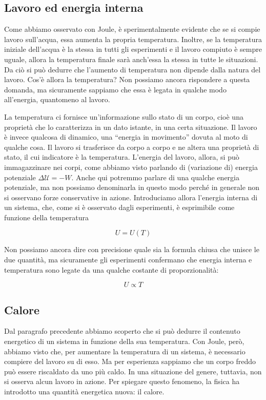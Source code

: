 \subsection{Lavoro ed energia interna}
Come abbiamo osservato con Joule, è sperimentalmente evidente che
se si compie lavoro sull'acqua, essa
aumenta la propria temperatura. Inoltre, se la temperatura iniziale
dell'acqua è la stessa in tutti gli esperimenti e il lavoro compiuto
è sempre uguale, allora la temperatura finale sarà anch'essa la stessa
in tutte le situazioni. Da ciò si può dedurre che l'aumento di
temperatura non dipende dalla natura del lavoro. Cos'è allora la
temperatura? Non possiamo ancora rispondere a questa domanda, ma
sicuramente sappiamo che essa è legata in qualche modo all'energia,
quantomeno al lavoro.

La temperatura ci fornisce un'informazione sullo stato di
un corpo, cioè una proprietà che lo caratterizza in un dato istante,
in una certa situazione. Il lavoro è invece qualcosa di dinamico,
una ``energia in movimento'' dovuta al moto di qualche cosa. Il
lavoro si trasferisce da corpo a corpo e ne altera una proprietà di
stato, il cui indicatore è la temperatura. L'energia del lavoro,
allora, si può immagazzinare nei corpi, come abbiamo visto parlando
di (variazione di) energia potenziale $\Delta\mathcal{U} = -W$.
Anche qui potremmo parlare di una qualche energia potenziale, ma
non possiamo denominarla in questo modo perché in generale non
si osservano forze conservative in azione. Introduciamo allora
l'energia interna di un sistema, che, come si è osservato
dagli esperimenti, è esprimibile come funzione della temperatura

\[ U = U(T) \]

\noindent Non possiamo ancora dire con precisione quale sia
la formula chiusa che unisce le due quantità, ma sicuramente
gli esperimenti confermano che energia interna e temperatura
sono legate da una qualche costante di proporzionalità:

\[ U \propto T \]

\subsection{Calore}
Dal paragrafo precedente abbiamo scoperto che si può dedurre il
contenuto energetico di un sistema in funzione della sua temperatura.
Con Joule, però, abbiamo visto che, per aumentare la temperatura di
un sistema, è necessario compiere del lavoro su di esso. Ma per
esperienza sappiamo che un corpo freddo può essere riscaldato da uno
più caldo. In una situazione del genere, tuttavia, non si osserva alcun lavoro in azione. Per
spiegare questo fenomeno, la fisica ha introdotto una quantità
energetica nuova: il calore.

